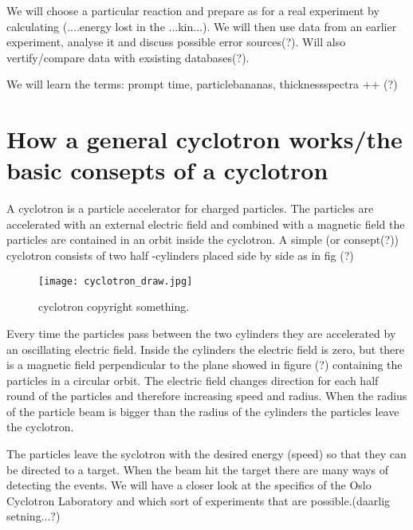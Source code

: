 \documentclass[11pt,a4wide]{article}
\begin{document}
We will choose a particular reaction and prepare as for a real experiment by calculating (....energy lost in the ...kin...). We will then use data from an earlier experiment, analyse it and discuss possible error sources(?). Will also vertify/compare data with exsisting databases(?).

We will learn the terms: prompt time, particlebananas, thicknessspectra ++ (?)

\section{How a general cyclotron works/the basic consepts of a cyclotron}

A cyclotron is a particle accelerator for charged particles. The particles are accelerated with an external electric field and combined with a magnetic field the particles are contained in an orbit inside the cyclotron. A simple (or consept(?)) cyclotron consists of two half -cylinders placed side by side as in fig (?)
\begin{figure}[htp]
\centering
\texttt{[image: cyclotron\_draw.jpg]}
\caption{cyclotron copyright something.}
\label{fig:tull}
\end{figure}
Every time the particles pass between the two cylinders they are accelerated by an oscillating electric field. Inside the cylinders the electric field is zero, but there is a magnetic field perpendicular to the plane showed in figure (?) containing the particles in a circular orbit. The electric field changes direction for each half round of the particles and therefore increasing speed and radius. When the radius of the particle beam is bigger than the radius of the cylinders the particles leave the cyclotron. 

The particles leave the syclotron with the desired energy (speed) so that they can be directed to a target. When the beam hit the target there are many ways of detecting the events. We will have a closer look at the specifics of the Oslo Cyclotron Laboratory and which sort of experiments that are possible.(daarlig setning...?)

\end{document}
